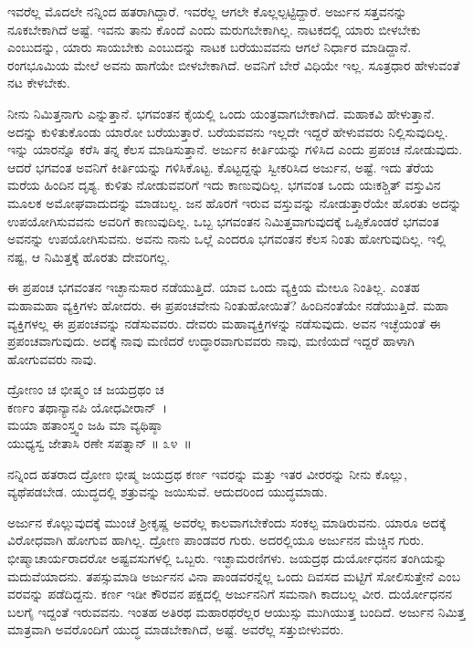 ಇವರೆಲ್ಲ ಮೊದಲೇ ನನ್ನಿಂದ ಹತರಾಗಿದ್ದಾರೆ. ಇವರೆಲ್ಲ ಆಗಲೇ ಕೊಲ್ಲಲ್ಪಟ್ಟಿದ್ದಾರೆ. ಅರ್ಜುನ ಸತ್ತವನನ್ನು ನೂಕಬೇಕಾಗಿದೆ ಅಷ್ಟೆ. ಇವನು ತಾನು ಕೊಂದೆ ಎಂದು ಮರುಗಬೇಕಾಗಿಲ್ಲ. ನಾಟಕದಲ್ಲಿ ಯಾರು ಬೀಳಬೇಕು ಎಂಬುದನ್ನು, ಯಾರು ಸಾಯಬೇಕು ಎಂಬುದನ್ನು ನಾಟಕ ಬರೆಯುವವನು ಆಗಲೆ ನಿರ್ಧಾರ ಮಾಡಿದ್ದಾನೆ. ರಂಗಭೂಮಿಯ ಮೇಲೆ ಅವನು ಹಾಗೆಯೇ ಬೀಳಬೇಕಾಗಿದೆ. ಅವನಿಗೆ ಬೇರೆ ವಿಧಿಯೇ ಇಲ್ಲ. ಸೂತ್ರಧಾರ ಹೇಳುವಂತೆ ನಟ ಕೇಳಬೇಕು.

ನೀನು ನಿಮಿತ್ತನಾಗು ಎನ್ನುತ್ತಾನೆ. ಭಗವಂತನ ಕೈಯಲ್ಲಿ ಒಂದು ಯಂತ್ರವಾಗಬೇಕಾಗಿದೆ. ಮಹಾಕವಿ ಹೇಳುತ್ತಾನೆ. ಅದನ್ನು ಕುಳಿತುಕೊಂಡು ಯಾರೋ ಬರೆಯುತ್ತಾರೆ. ಬರೆಯವವನು ಇಲ್ಲದೇ ಇದ್ದರೆ ಹೇಳುವವರು ನಿಲ್ಲಿಸುವುದಿಲ್ಲ. ಇನ್ನು ಯಾರನ್ನೊ ಕರೆಸಿ ತನ್ನ ಕೆಲಸ ಮಾಡಿಸುತ್ತಾನೆ. ಅರ್ಜುನ ಕೀರ್ತಿಯನ್ನು ಗಳಿಸಿದ ಎಂದು ಪ್ರಪಂಚ ನೋಡುವುದು. ಆದರೆ ಭಗವಂತ ಅವನಿಗೆ ಕೀರ್ತಿಯನ್ನು ಗಳಿಸಿಕೊಟ್ಟ. ಕೊಟ್ಟದ್ದನ್ನು ಸ್ವೀಕರಿಸಿದ ಅರ್ಜುನ, ಅಷ್ಟೆ. ಇದು ತೆರೆಯ ಮರೆಯ ಹಿಂದಿನ ದೃಶ್ಯ. ಕುಳಿತು ನೋಡುವವರಿಗೆ ಇದು ಕಾಣುವುದಿಲ್ಲ. ಭಗವಂತ ಒಂದು ಯಃಕಶ್ಚಿತ್ ವಸ್ತುವಿನ ಮೂಲಕ ಅಮೋಘವಾದುದನ್ನು ಮಾಡಬಲ್ಲ. ಜನ ಹೊರಗೆ ಇರುವ ವಸ್ತುವನ್ನು ನೋಡುತ್ತಾರೆಯೇ ಹೊರತು ಅದನ್ನು ಉಪಯೋಗಿಸುವವನು ಅವರಿಗೆ ಕಾಣುವುದಿಲ್ಲ. ಒಬ್ಬ ಭಗವಂತನ ನಿಮಿತ್ತವಾಗುವುದಕ್ಕೆ ಒಪ್ಪಿಕೊಂಡರೆ ಭಗವಂತ ಅವನನ್ನು ಉಪಯೋಗಿಸುವನು. ಅವನು ನಾನು ಒಲ್ಲೆ ಎಂದರೂ ಭಗವಂತನ ಕೆಲಸ ನಿಂತು ಹೋಗುವುದಿಲ್ಲ. ಇಲ್ಲಿ ನಷ್ಟ, ಆ ನಿಮಿತ್ತಕ್ಕೆ ಹೊರತು ದೇವರಿಗಲ್ಲ.

ಈ ಪ್ರಪಂಚ ಭಗವಂತನ ಇಚ್ಛಾನುಸಾರ ನಡೆಯುತ್ತಿದೆ. ಯಾವ ಒಂದು ವ್ಯಕ್ತಿಯ ಮೇಲೂ ನಿಂತಿಲ್ಲ. ಎಂತಹ ಮಹಾಮಹಾ ವ್ಯಕ್ತಿಗಳು ಹೋದರು. ಈ ಪ್ರಪಂಚವೇನು ನಿಂತುಹೋಯಿತೆ? ಹಿಂದಿನಂತೆಯೇ ನಡೆಯುತ್ತಿದೆ. ಮಹಾ ವ್ಯಕ್ತಿಗಳಲ್ಲ ಈ ಪ್ರಪಂಚವನ್ನು ನಡೆಸುವವರು. ದೇವರು ಮಹಾವ್ಯಕ್ತಿಗಳನ್ನು ನಡೆಸುವುದು. ಅವನ ಇಚ್ಛೆಯಂತೆ ಈ ಪ್ರಪಂಚವಾಗುವುದು. ಅದಕ್ಕೆ ನಾವು ಮಣಿದರೆ ಉದ್ಧಾರವಾಗುವವರು ನಾವು, ಮಣಿಯದೆ ಇದ್ದರೆ ಹಾಳಾಗಿ ಹೋಗುವವರು ನಾವು.

\begin{shloka}
ದ್ರೋಣಂ ಚ ಭೀಷ್ಮಂ ಚ ಜಯದ್ರಥಂ ಚ \\ ಕರ್ಣಂ ತಥಾನ್ಯಾನಪಿ ಯೋಧವೀರಾನ್~।\\ಮಯಾ ಹತಾಂಸ್ತ್ವಂ ಜಹಿ ಮಾ ವ್ಯಥಿಷ್ಠಾ \\ ಯುಧ್ಯಸ್ವ ಜೇತಾಸಿ ರಣೇ ಸಪತ್ನಾನ್ \hfill॥ ೩೪~॥
\end{shloka}

\begin{artha}
ನನ್ನಿಂದ ಹತರಾದ ದ್ರೋಣ ಭೀಷ್ಮ ಜಯದ್ರಥ ಕರ್ಣ ಇವರನ್ನು ಮತ್ತು ಇತರ ವೀರರನ್ನು ನೀನು ಕೊಲ್ಲು, ವ್ಯಥೆಪಡಬೇಡ. ಯುದ್ಧದಲ್ಲಿ ಶತ್ರುವನ್ನು ಜಯಿಸುವೆ. ಆದುದರಿಂದ ಯುದ್ಧಮಾಡು.
\end{artha}

ಅರ್ಜುನ ಕೊಲ್ಲುವುದಕ್ಕೆ ಮುಂಚೆ ಶ‍್ರೀಕೃಷ್ಣ ಅವರೆಲ್ಲ ಕಾಲವಾಗಬೇಕೆಂದು ಸಂಕಲ್ಪ ಮಾಡಿರುವನು. ಯಾರೂ ಅದಕ್ಕೆ ವಿರೋಧವಾಗಿ ಹೋಗುವ ಹಾಗಿಲ್ಲ. ದ್ರೋಣ ಪಾಂಡವರ ಗುರು. ಅದರಲ್ಲಿಯೂ ಅರ್ಜುನನ ಮೆಚ್ಚಿನ ಗುರು. ಭೀಷ್ಮಾಚಾರ್ಯರಾದರೋ ಅಷ್ಟವಸುಗಳಲ್ಲಿ ಒಬ್ಬರು. ಇಚ್ಛಾಮರಣಿಗಳು. ಜಯದ್ರಥ ದುರ್ಯೋಧನನ ತಂಗಿಯನ್ನು ಮದುವೆಯಾದನು. ತಪಸ್ಸುಮಾಡಿ ಅರ್ಜುನನ ವಿನಾ ಪಾಂಡವರನ್ನೆಲ್ಲ ಒಂದು ದಿವಸದ ಮಟ್ಟಿಗೆ ಸೋಲಿಸುತ್ತೇನೆ ಎಂಬ ವರವನ್ನು ಪಡೆದಿದ್ದನು. ಕರ್ಣ ಇಡೀ ಕೌರವನ ಪಕ್ಷದಲ್ಲಿ ಅರ್ಜುನನಿಗೆ ಸಮನಾಗಿ ಕಾದಬಲ್ಲ ವೀರ. ದುರ್ಯೋಧನನ ಬಲಗೈ ಇದ್ದಂತೆ ಇರುವವನು. ಇಂತಹ ಅತಿರಥ ಮಹಾರಥರೆಲ್ಲರ ಆಯುಸ್ಸು ಮುಗಿಯುತ್ತ ಬಂದಿದೆ. ಅರ್ಜುನ ನಿಮಿತ್ತ ಮಾತ್ರವಾಗಿ ಅವರೊಂದಿಗೆ ಯುದ್ಧ ಮಾಡಬೇಕಾಗಿದೆ, ಅಷ್ಟೆ. ಅವರೆಲ್ಲ ಸತ್ತುಬೀಳುವರು.

